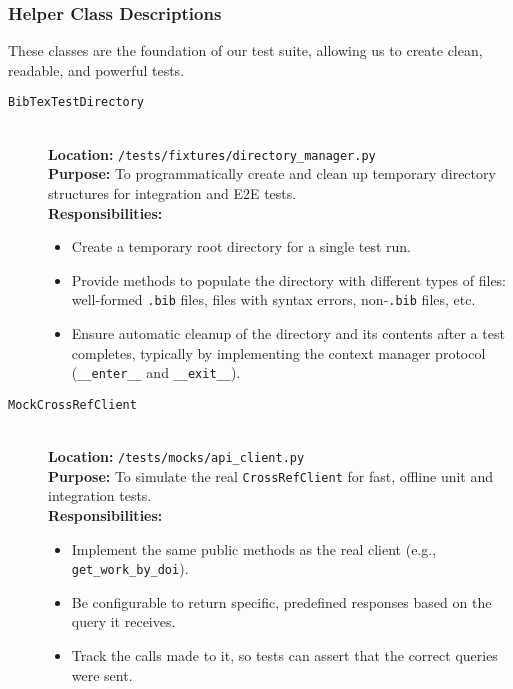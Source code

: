 \documentclass[11pt, a4paper]{article}
\begin{document}
\subsubsection{Helper Class Descriptions}
These classes are the foundation of our test suite, allowing us to create clean, readable, and powerful tests.

\begin{description}
    \item[\texttt{BibTexTestDirectory}] \hfill \\
    \textbf{Location:} \texttt{/tests/fixtures/directory\_manager.py} \\
    \textbf{Purpose:} To programmatically create and clean up temporary directory structures for integration and E2E tests. \\
    \textbf{Responsibilities:}
    \begin{itemize}[leftmargin=*]
        \item Create a temporary root directory for a single test run.
        \item Provide methods to populate the directory with different types of files: well-formed \texttt{.bib} files, files with syntax errors, non-\texttt{.bib} files, etc.
        \item Ensure automatic cleanup of the directory and its contents after a test completes, typically by implementing the context manager protocol (\texttt{\_\_enter\_\_} and \texttt{\_\_exit\_\_}).
    \end{itemize}

    \item[\texttt{MockCrossRefClient}] \hfill \\
    \textbf{Location:} \texttt{/tests/mocks/api\_client.py} \\
    \textbf{Purpose:} To simulate the real \texttt{CrossRefClient} for fast, offline unit and integration tests. \\
    \textbf{Responsibilities:}
    \begin{itemize}[leftmargin=*]
        \item Implement the same public methods as the real client (e.g., \texttt{get\_work\_by\_doi}).
        \item Be configurable to return specific, predefined responses based on the query it receives.
        \item Track the calls made to it, so tests can assert that the correct queries were sent.
    \end{itemize}


\end{description}
\end{document}
